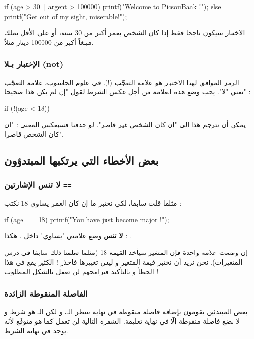 \begin{Csource}
if (age > 30 || argent > 100000)
{
	printf("Welcome to PicsouBank !");
}
else
{
	printf("Get out of my sight, miserable!");
}
\end{Csource}

الاختبار سيكون ناجحا فقط إذا كان الشخص بعمر أكبر من 30 سنة، أو على الأقل يملك مبلغاً أكبر من 100000 دينار مثلاً.

\subsubsection{الإختبار بـلا (\textenglish{not})}

الرمز الموافق لهذا الاختبار هو علامة التعجّب (!). في علوم الحاسوب، علامة التعجّب تعني "لا". يجب  وضع هذه العلامة من أجل عكس الشرط لقول  "إن لم يكن هذا صحيحا" :
\begin{Csource}
if (!(age < 18))
\end{Csource}

يمكن أن نترجم هذا إلى "إن كان الشخص غير قاصر". لو حذفنا
\InlineCode{!}
فسيعكس المعنى : "إن كان الشخص قاصرا".
\subsection{بعض الأخطاء التي يرتكبها المبتدؤون}

\subsubsection{لا تنس الإشارتين \texttt{==}}

مثلما قلت سابقا، لكي نختبر ما إن كان العمر يساوي 18 نكتب :

\begin{Csource}
if (age == 18)
{
	printf("You have just become major !");
}
\end{Csource}

\textbf{لا تنس}
وضع علامتي "يساوي" داخل
،
هكذا :
\InlineCode{==}.

إن وضعت علامة 
\InlineCode{=}
واحدة فإن المتغير 
سيأخذ القيمة 18 (مثلما تعلمنا ذلك سابقا في درس المتغيرات). نحن نريد أن نختبر قيمة المتغير و ليس تغييرها فاحذر ! الكثير يقع في هذا الخطأ و بالتأكيد فبرامجهم لن تعمل بالشكل المطلوب !

\subsubsection{الفاصلة المنقوطة الزائدة}

بعض المبتدئين يقومون بإضافة فاصلة منقوطة في نهاية سطر الـ، و لكن الـ هو شرط و لا نضع فاصلة منقوطة إلّا في نهاية تعليمة. الشفرة التالية لن تعمل كما هو متوقّع لأنّه يوجد
\InlineCode{;}
في نهاية الشرط.


